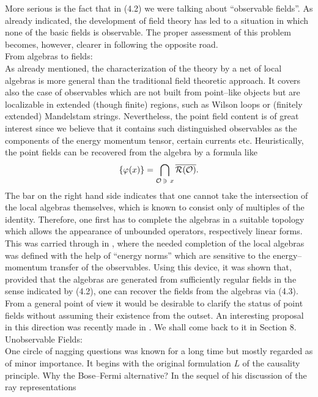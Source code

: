 More serious is the fact that in (4.2) we were talking about
``observable fields''. As already indicated, the development of field
theory has led to a situation in which none of the basic fields is
observable. The proper assessment of this problem becomes, however,
clearer in following the opposite road. \\[2mm]
{\noindent \subsect {}From algebras to fields:} \\[2mm]
As already mentioned, the characterization of the theory by a net of
local algebras is more general than the traditional field theoretic
approach. It covers also the case of observables which are not built
from point--like objects but are localizable in extended (though finite)
regions, such as Wilson loops or (finitely extended) Mandelstam
strings. Nevertheless, the point field content is of great interest
since we believe that it contains such distinguished observables as
the components of the energy momentum tensor, certain currents
etc. Heuristically, the point fields can be recovered from the algebra
by a formula like
\begin{equation}
\{\varphi(x)\} = \bigcap_{{\cal O} \, \ni \ x} \overline{{\cal R}({\cal O})}. 
\end{equation}
The bar on the right hand side indicates that one cannot take the
intersection of the local algebras themselves, which is known to
consist only of multiples of the identity. Therefore, one first has to
complete the algebras in a suitable topology which allows the 
appearance of unbounded operators, respectively linear forms. This was
carried through in \cite{FrHe}, where the needed completion of the
local algebras was defined with the help of ``energy norms'' which are
sensitive to the energy--momentum transfer of the observables. Using
this device, it was shown that, provided that the algebras are
generated from sufficiently regular fields in the sense indicated by
(4.2), one can recover the fields from the algebras via (4.3). {}From a
general point of view it would be desirable to clarify the status of
point fields without assuming their existence from the outset. An
interesting proposal in this direction was recently made in
\cite{HaOj}. We shall come back to it in Section 8. \\[2mm]
{\noindent \subsect Unobservable Fields:} \\[2mm]
One circle of nagging questions was known for a long time but mostly
regarded as of minor importance. It begins with the original
formulation $L$ of the causality principle. Why the Bose--Fermi
alternative? In the sequel of his discussion of the ray representations
